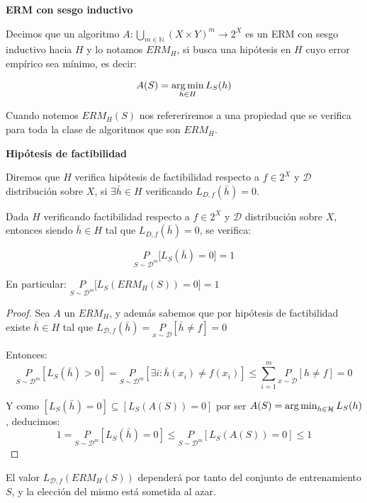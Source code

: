 \begin{definition*} \textbf{ERM con sesgo inductivo}

Decimos que un algoritmo $A: \underset{m\in \mathbb{N}}{\bigcup} (X\times Y)^m \rightarrow 2^{X}$ es un ERM con sesgo 
inductivo hacia $H$ y lo notamos $ERM_H$, si busca una hipótesis en $H$ cuyo error empírico 
sea mínimo, es decir:

\[A(S) = \operatorname*{arg\,min}_{h\in H} L_S(h)\]
\end{definition*}

Cuando notemos $ERM_H(S)$ nos refereriremos a una propiedad que se verifica para toda la clase de algoritmos que 
son $ERM_H$.

\begin{definition*} \textbf{Hipótesis de factibilidad}

Diremos que $H$ verifica hipótesis de factibilidad respecto a $f\in 2^X$ y $\mathcal{D}$ distribución sobre $X$, si 
$\exists {\bar{h}} \in H$ verificando $L_{D,f}(\bar{h}) = 0$.
\end{definition*}

\begin{fact}
Dada $H$ verificando factibilidad respecto a $f\in 2^X$ y $\mathcal{D}$ distribución sobre $X$, entonces siendo 
${\bar{h}} \in H$ tal que $L_{D,f}(\bar{h}) = 0$, se verifica:

\[\underset{S\sim \mathcal{D}^m}{P} \bigg[L_S(\bar{h}) = 0 \bigg] = 1\]

En particular: $\underset{S\sim \mathcal{D}^m}{P} \bigg[L_S(ERM_H(S)) = 0 \bigg] = 1$
\label{fact:ermh}
\end{fact}

  \begin{proof}
  Sea $A$ un $ERM_H$, y además sabemos que por hipótesis de factibilidad existe $\bar{h} \in H$ tal que
  $L_{\mathcal{D},f}(\bar{h}) = \underset{x\sim \mathcal{D}}{P}[\bar{h}\neq f] = 0$

  Entonces: \[\underset{S\sim \mathcal{D}^m}{P}[L_S(\bar{h}) > 0] = \underset{S\sim \mathcal{D}^m}{P}
  [\exists i: \bar{h}(x_i) \neq f(x_i)] \le \sum_{i=1}^m \underset{x\sim \mathcal{D}}{P}[h\neq f] = 0\]

  Y como $[L_S(\bar{h}) = 0] \subseteq [L_S(A(S)) = 0]$ por ser $A(S) = \operatorname*{arg\,min}_{h\in \mathcal{H}} L_S(h)$, deducimos:
  \[1 = \underset{S\sim \mathcal{D}^m}{P}[L_S(\bar{h}) = 0] \le \underset{S\sim \mathcal{D}^m}{P}[L_S(A(S)) = 0] \le 1\]
  \end{proof}

El valor $L_{\mathcal{D},f}(ERM_H(S))$ dependerá por tanto del conjunto de entrenamiento $S$, y la elección del
mismo está sometida al azar. 


